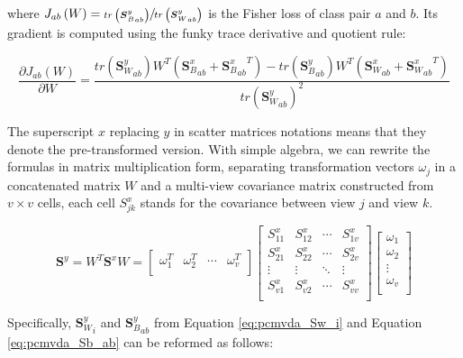         where $J_{ab}\left(W\right)=\sfrac{tr\left({\boldsymbol{S}_B^y}_{ab}\right)}{tr\left({\boldsymbol{S}_W^y}_{ab}\right)}$ is the Fisher loss of class pair $a$ and $b$. Its gradient is computed using the funky trace derivative and quotient rule:

        \begin{equation}
            \frac{\partial J_{ab}\left(W\right)}{\partial W}=\frac{tr\left({\boldsymbol{S}_W^y}_{ab}\right)W^T\left({\boldsymbol{S}_B^x}_{ab}+{{\boldsymbol{S}_B^x}_{ab}}^T\right)-tr\left({\boldsymbol{S}_B^y}_{ab}\right)W^T\left({\boldsymbol{S}_W^x}_{ab}+{{\boldsymbol{S}_W^x}_{ab}}^T\right)}{{tr\left({\boldsymbol{S}_W^y}_{ab}\right)}^2}
            \label{eq:grad_Jab}
        \end{equation}

        The superscript $x$ replacing $y$ in scatter matrices notations means that they denote the pre-transformed version. With simple algebra, we can rewrite the formulas in matrix multiplication form, separating transformation vectors $\omega_j$ in a concatenated matrix $W$ and a multi-view covariance matrix constructed from $v\times v$ cells, each cell $S^x_{jk}$ stands for the covariance between view $j$ and view $k$.

        \begin{equation}
            \boldsymbol{S}^y=W^T\boldsymbol{S}^xW=\left[\begin{matrix}\omega_1^T&\omega_2^T&\cdots&\omega_v^T\\\end{matrix}\right]\left[\begin{matrix}S^x_{11}&S^x_{12}&\cdots&S^x_{1v}\\S^x_{21}&S^x_{22}&\cdots&S^x_{2v}\\\vdots&\vdots&\ddots&\vdots\\S^x_{v1}&S^x_{v2}&\cdots&S^x_{vv}\\\end{matrix}\right]\left[\begin{matrix}\omega_1\\\omega_2\\\vdots\\\omega_v\\\end{matrix}\right]
        \end{equation}

        Specifically, ${\boldsymbol{S}^y_W}_{i}$ and ${\boldsymbol{S}^y_B}_{ab}$ from Equation \eqref{eq:pcmvda_Sw_i} and Equation \eqref{eq:pcmvda_Sb_ab} can be reformed as follows:

